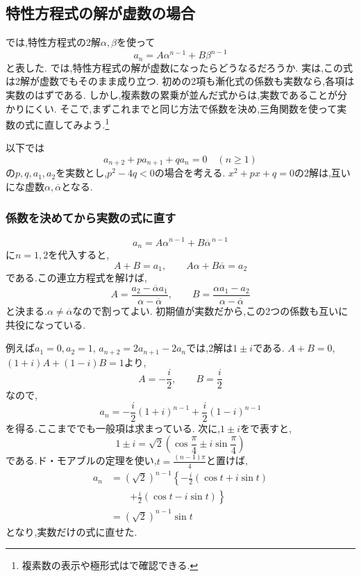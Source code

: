 \subsection{特性方程式の解が虚数の場合}\label{節：特性方程式の解が虚数の場合}

では,特性方程式の2解$\alpha,\beta$を使って
\[
  a_n=A\alpha^{n-1}+B\beta^{n-1}
\]
と表した.
では,特性方程式の解が虚数になったらどうなるだろうか.
実は,この式は2解が虚数でもそのまま成り立つ.
初めの2項も漸化式の係数も実数なら,各項は実数のはずである.
しかし,複素数の累乗が並んだ式からは,実数であることが分かりにくい.
そこで,まずこれまでと同じ方法で係数を決め,三角関数を使って実数の式に直してみよう.\footnote{複素数の表示や極形式はで確認できる.}

以下では
\[
  a_{n+2}+pa_{n+1}+qa_n=0\quad(n\ge1)
\]
の$p,q,a_1,a_2$を実数とし,$p^2-4q<0$の場合を考える.
$x^2+px+q=0$の2解は,互いにな虚数$\alpha,\overline\alpha$となる.

\subsubsection{係数を決めてから実数の式に直す}
\[
  a_n=A\alpha^{n-1}+B\overline\alpha^{\,n-1}
\]
に$n=1,2$を代入すると,
\[
  A+B=a_1,\qquad A\alpha+B\overline\alpha=a_2
\]
である.この連立方程式を解けば,
\[
  A=\frac{a_2-\overline\alpha a_1}{\alpha-\overline\alpha},
  \qquad
  B=\frac{\alpha a_1-a_2}{\alpha-\overline\alpha}
\]
と決まる.$\alpha\ne\overline\alpha$なので割ってよい.
初期値が実数だから,この2つの係数も互いに共役になっている.

例えば$a_1=0,a_2=1$, $a_{n+2}=2a_{n+1}-2a_n$では,2解は$1\pm i$である.
$A+B=0$, $(1+i)A+(1-i)B=1$より,
\[
  A=-\frac{i}{2},\qquad B=\frac{i}{2}
\]
なので,
\[
  a_n=-\frac{i}{2}(1+i)^{n-1}+\frac{i}{2}(1-i)^{n-1}
\]
を得る.ここまででも一般項は求まっている.
次に,$1\pm i$をで表すと,
\[
  1\pm i=\sqrt2\left(\cos\frac{\pi}{4}\pm i\sin\frac{\pi}{4}\right)
\]
である.ド・モアブルの定理を使い,$t=\frac{(n-1)\pi}{4}$と置けば,
\[
  \begin{aligned}
    a_n&=(\sqrt2)^{n-1}\left\{-\frac{i}{2}(\cos t+i\sin t)\right.\\
    &\qquad\left.+\frac{i}{2}(\cos t-i\sin t)\right\}\\
    &=(\sqrt2)^{n-1}\sin t
  \end{aligned}
\]
となり,実数だけの式に直せた.

